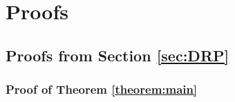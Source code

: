 \section{Proofs}
\label{sec:appendix:a}

\subsection{Proofs from Section \ref{sec:DRP}}

\newcommand{\usestwod}{\todo{Uses 2D requirement:}}
\renewcommand{\usestwod}{}


\subsubsection{Proof of Theorem \ref{theorem:main}}\label{theorem:main:proof}






